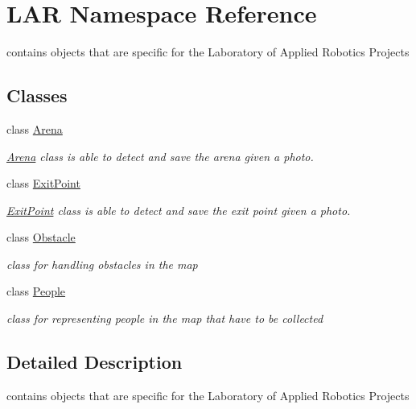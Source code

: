 \hypertarget{namespace_l_a_r}{}\section{L\+AR Namespace Reference}
\label{namespace_l_a_r}


contains objects that are specific for the Laboratory of Applied Robotics Projects  


\subsection*{Classes}
\begin{DoxyCompactItemize}
\item 
class \mbox{\hyperlink{class_l_a_r_1_1_arena}{Arena}}
\begin{DoxyCompactList}\small\item\em \mbox{\hyperlink{class_l_a_r_1_1_arena}{Arena}} class is able to detect and save the arena given a photo. \end{DoxyCompactList}\item 
class \mbox{\hyperlink{class_l_a_r_1_1_exit_point}{Exit\+Point}}
\begin{DoxyCompactList}\small\item\em \mbox{\hyperlink{class_l_a_r_1_1_exit_point}{Exit\+Point}} class is able to detect and save the exit point given a photo. \end{DoxyCompactList}\item 
class \mbox{\hyperlink{class_l_a_r_1_1_obstacle}{Obstacle}}
\begin{DoxyCompactList}\small\item\em class for handling obstacles in the map \end{DoxyCompactList}\item 
class \mbox{\hyperlink{class_l_a_r_1_1_people}{People}}
\begin{DoxyCompactList}\small\item\em class for representing people in the map that have to be collected \end{DoxyCompactList}\end{DoxyCompactItemize}


\subsection{Detailed Description}
contains objects that are specific for the Laboratory of Applied Robotics Projects 